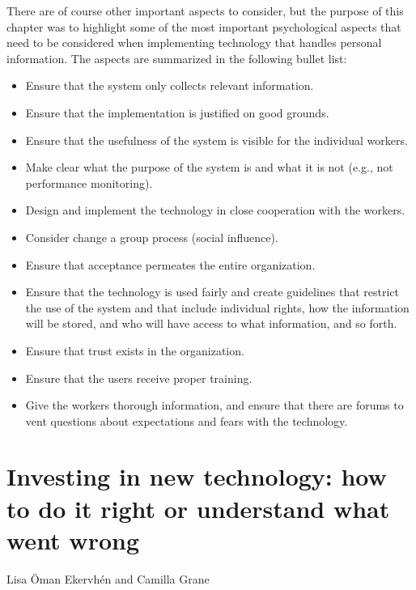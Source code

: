 \documentclass[
  12pt,
]{scrbook}
\newenvironment{chap-auth}
{\vspace{1cm}\begin{center}\begin{flushright}\sffamily\noindent}
  {\end{flushright}\end{center}\vspace{1cm}}
\begin{document}
There are of course other important aspects to consider, but the purpose of this chapter was to highlight some of the most important psychological aspects that need to be considered when implementing technology that handles personal information. The aspects are summarized in the following bullet list:~

\begin{itemize}
\item
  Ensure that the system only collects relevant information.~
\item
  Ensure that the implementation is justified on good grounds.
\item
  Ensure that the usefulness of the system is visible for the individual workers.
\item
  Make clear what the purpose of the system is and what it is not (e.g., not performance monitoring).
\item
  Design and implement the technology in close cooperation with the workers.
\item
  Consider change a group process (social influence).
\item
  Ensure that acceptance permeates the entire organization.
\item
  Ensure that the technology is used fairly and create guidelines that restrict the use of the system and that include individual rights, how the information will be stored, and who will have access to what information, and so forth.~
\item
  Ensure that trust exists in the organization.
\item
  Ensure that the users receive proper training.
\item
  Give the workers thorough information, and ensure that there are forums to vent questions about expectations and fears with the technology.
\end{itemize}

\hypertarget{investing-in-new-technology-how-to-do-it-right-or-understand-what-went-wrong}{%
\chapter{Investing in new technology: how to do it right or understand what went wrong}\label{investing-in-new-technology-how-to-do-it-right-or-understand-what-went-wrong}}

\begin{chap-auth}
Lisa Öman Ekervhén and Camilla Grane
\end{chap-auth}
\end{document}
